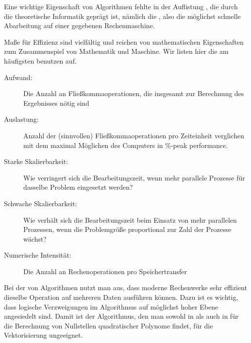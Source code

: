 \begin{remark}
  Eine wichtige Eigenschaft von Algorithmen fehlte in der Auflistung
  , die durch die
  theoretische Informatik geprägt ist, nämlich die ,
  also die möglichst schnelle Abarbeitung auf einer gegebenen
  Rechenmaschine.

  Maße für Effizienz sind vielfältig und reichen von mathematischen
  Eigenschaften zum Zusammenspiel von Mathematik und Maschine. Wir
  listen hier die am häufigsten benutzen auf.

  \begin{description}
  \item[Aufwand:] Die Anzahl an Fließkommaoperationen, die insgesamt
    zur Berechnung des Ergebnisses nötig sind
  \item[Auslastung:] Anzahl der (sinnvollen) Fließkommaoperationen pro
    Zeiteinheit verglichen mit dem maximal Möglichen des Computers in
    \glqq\%-peak performance\grqq.
  \item[Starke Skalierbarkeit:] Wie verringert sich die
    Bearbeitungszeit, wenn mehr parallele Prozesse für dasselbe
    Problem eingesetzt werden?
  \item[Schwache Skalierbarkeit:] Wie verhält sich die
    Bearbeitungszeit beim Einsatz von mehr parallelen Prozessen, wenn
    die Problemgröße proportional zur Zahl der Prozesse wächst?
  \item[Numerische Intensität:] Die Anzahl an Rechenoperationen pro
    Speichertransfer
  \end{description}
\end{remark}

\begin{remark}
  Bei der  von Algorithmen nutzt man aus, dass
  moderne Rechenwerke sehr effizient dieselbe Operation auf mehreren
  Daten ausführen können. Dazu ist es wichtig, dass logische
  Verzweigungen im Algorithmus auf möglichst hoher Ebene angesiedelt
  sind. Damit ist der Algorithmus, den man sowohl in
  \cite{Rannacher17} als auch in \cite{DeuflhardHohmann08} für die
  Berechnung von Nullstellen quadratischer Polynome findet, für die
  Vektorisierung ungeeignet.
\end{remark}


